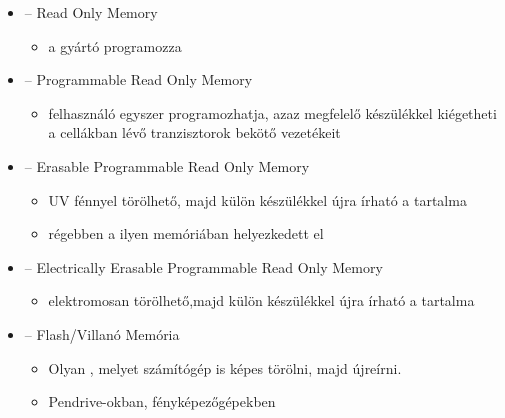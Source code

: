 \documentclass[main.tex]{subfiles}
\begin{document}
  \begin{itemize}
    \item {} \tabto{1.8cm} – \tabto{2.5cm}
    Read Only Memory
    \begin{itemize}
      \item a gyártó programozza
    \end{itemize}
    
    \item {} \tabto{1.8cm} – \tabto{2.5cm}
    Programmable Read Only Memory
    \begin{itemize}
      \item felhasználó egyszer programozhatja,
      azaz megfelelő készülékkel kiégetheti 
      a cellákban lévő tranzisztorok bekötő vezetékeit
    \end{itemize}
    
    \item {} \tabto{1.8cm} – \tabto{2.5cm}
    Erasable Programmable Read Only Memory
    \begin{itemize}
      \item UV fénnyel törölhető, majd külön
      készülékkel újra írható a tartalma

      \item régebben a  ilyen
      memóriában helyezkedett el
    \end{itemize}

    \item {} \tabto{1.8cm} – \tabto{2.5cm}
    Electrically Erasable Programmable Read Only Memory
    \begin{itemize}
      \item elektromosan törölhető,majd külön
      készülékkel újra írható a tartalma
    \end{itemize}

    \item {} \tabto{1.8cm} – \tabto{2.5cm}
    Flash/Villanó Memória
    \begin{itemize}
      \item Olyan , melyet számítógép
      is képes törölni, majd újreírni.

      \item Pendrive-okban, fényképezőgépekben
    \end{itemize}
  \end{itemize}
\end{document}
